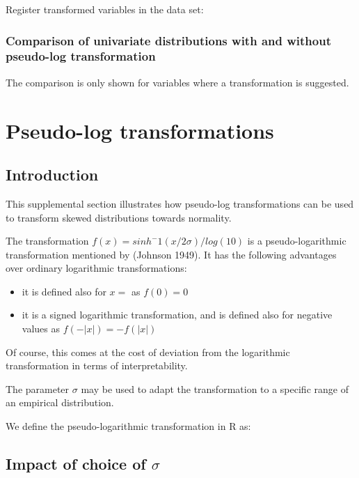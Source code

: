 \documentclass[
  letterpaper,
  DIV=11,
  numbers=noendperiod]{scrreport}
\providecommand{\tightlist}{%
  \setlength{\itemsep}{0pt}\setlength{\parskip}{0pt}}\usepackage{longtable,booktabs,array}
\begin{document}
Register transformed variables in the data set:

\hypertarget{comparison-of-univariate-distributions-with-and-without-pseudo-log-transformation}{%
\subsection{Comparison of univariate distributions with and without
pseudo-log
transformation}\label{comparison-of-univariate-distributions-with-and-without-pseudo-log-transformation}}

The comparison is only shown for variables where a transformation is
suggested.


\hypertarget{pseudo-log-transformations}{%
\chapter{Pseudo-log transformations}\label{pseudo-log-transformations}}

\hypertarget{introduction}{%
\section{Introduction}\label{introduction}}

This supplemental section illustrates how pseudo-log transformations can
be used to transform skewed distributions towards normality.

The transformation \(f(x) = sinh^-1(x/2\sigma)/log(10)\) is a
pseudo-logarithmic transformation mentioned by (Johnson 1949). It has
the following advantages over ordinary logarithmic transformations:

\begin{itemize}
\tightlist
\item
  it is defined also for \(x=\) as \(f(0) = 0\)
\item
  it is a signed logarithmic transformation, and is defined also for
  negative values as \(f(-|x|)=-f(|x|)\)
\end{itemize}

Of course, this comes at the cost of deviation from the logarithmic
transformation in terms of interpretability.

The parameter \(\sigma\) may be used to adapt the transformation to a
specific range of an empirical distribution.

We define the pseudo-logarithmic transformation in R as:

\hypertarget{impact-of-choice-of-sigma}{%
\section{\texorpdfstring{Impact of choice of
\(\sigma\)}{Impact of choice of \textbackslash sigma}}\label{impact-of-choice-of-sigma}}
\end{document}
